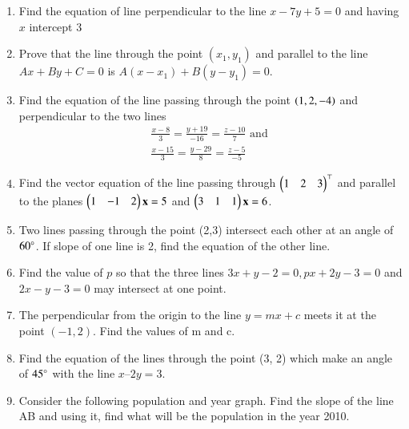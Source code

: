 \begin{enumerate}[label=\thesubsection.\arabic*,ref=\thesubsection.\theenumi]
\label{chapters/11/10/3/7}
\\
\solution 

\item Find the equation of line perpendicular to the line $x-7y+5=0$ and having $x$ intercept $3$\\
\label{chapters/11/10/3/8}
\solution

\item Prove that the line through the point $(x_1,y_1)$ and parallel to the line $Ax+By+C=0$ is $A(x-x_1)+B(y-y_1)=0$.
\label{chapters/11/10/3/11}
\\
\solution

	\item Find the equation of the line passing through the point $\left(1,2,-4\right)$ and perpendicular to the two lines
\begin{align}
	\frac{x-8}{3}=\frac{y+19}{-16}=\frac{z-10}{7} \text{ and }\\ \frac{x-15}{3}=\frac{y-29}{8}=\frac{z-5}{-5} 
\end{align}
    \solution
		
	\item  Find the vector equation of the line passing through $\begin{pmatrix}1&2&3\end{pmatrix}^{\top}$ and parallel to the planes $\begin{pmatrix}1&-1&2\end{pmatrix}\mathbf{x} = 5$ and $\begin{pmatrix}3&1&1\end{pmatrix}\mathbf{x} = 6$.  
		\\
    \solution
		
	\item
 Two lines passing through the point (2,3) intersect each other at an angle of $60\degree$. If slope of one line is 2, find the equation of the other line.
\label{chapters/11/10/3/12}
 \\
 \solution
		
\item
Find the value of $p$ so that the three lines $3x+y-2=0,px+2y-3=0$ and $2x-y-3=0$ may intersect at one point.
\label{11.10.4.9}
\\
\solution

 \item The perpendicular from the origin to the line $y=mx+c$ meets it at the point $(-1,2)$. Find the values of m and c.
 \label{11.10.3.15}
	 \\
 \solution
 
\item Find the equation of the lines through the point (3, 2) which make an angle of $45\degree$  with the line $x – 2y = 3$.
\label{chapters/11/10/4/11}\\
\solution

\item Consider the following population and year graph. Find the slope of the line AB and using it, find what will be the population in the year 2010.

\end{enumerate}
